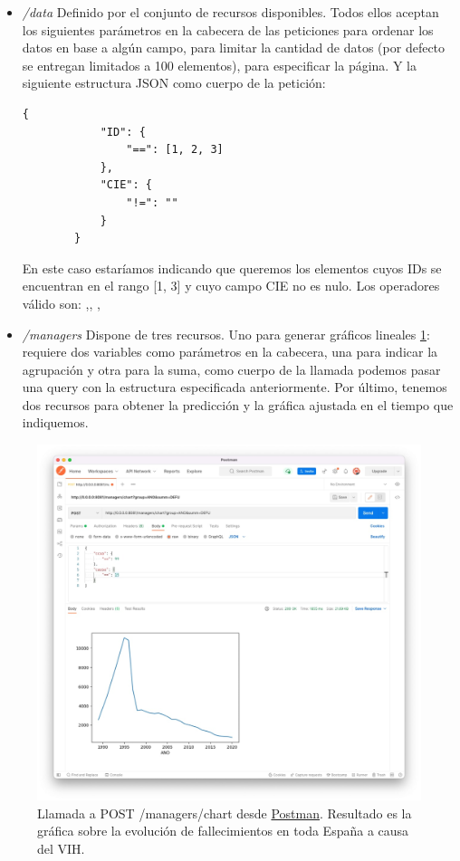 \begin{itemize}
    \item \textit{/data} Definido por el conjunto de recursos disponibles. Todos ellos
    aceptan los siguientes parámetros en la cabecera de las peticiones 
    para ordenar los datos en base a algún campo,  para limitar la
    cantidad de datos (por defecto se entregan limitados a 100 elementos), 
    para especificar la página. Y la siguiente estructura JSON como cuerpo de la petición:
    \begin{lstlisting}[caption=Body de una posible petición a \codeword{POST /data/diceases}] 
        { 
            "ID": {  
                "==": [1, 2, 3] 
            }, 
            "CIE": { 
                "!=": "" 
            } 
        }
    \end{lstlisting}
    En este caso estaríamos indicando que queremos los elementos cuyos IDs se encuentran
    en el rango [1, 3] y cuyo campo CIE no es nulo. Los operadores válido son:
    \codeword{==},\codeword{!=}, \codeword{<}, \codeword{>}

    \item \textit{/managers} Dispone de tres recursos. Uno para generar gráficos lineales
    \ref{fig:graficos-api}: requiere dos variables como parámetros en la cabecera, una
    para indicar la agrupación y otra para la suma, como cuerpo de la llamada podemos
    pasar una query con la estructura especificada anteriormente. Por último, tenemos dos
    recursos para obtener la predicción y la gráfica ajustada en el tiempo que indiquemos.
\end{itemize}

\FloatBarrier
\begin{figure}[h]
	\centering	
	\includegraphics[width=\textwidth]{doc/logos/imgs/api-managers.jpg}
	\caption{ Llamada a POST /managers/chart desde
	\href{https://www.postman.com/}{Postman}. Resultado es la gráfica sobre la evolución
	de fallecimientos en toda España a causa del VIH. }
    \label{fig:graficos-api}
\end{figure}
\FloatBarrier

